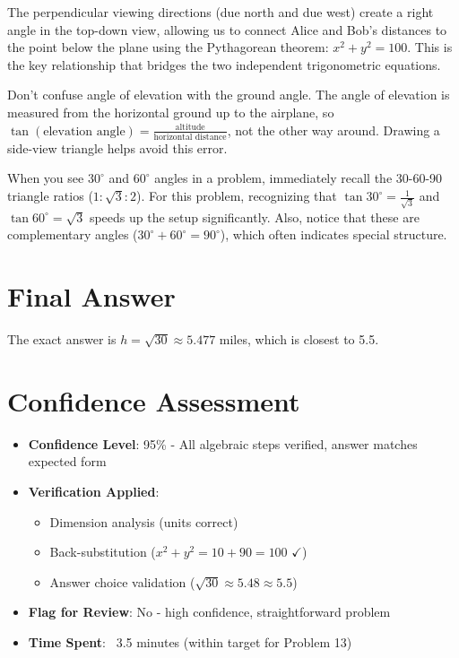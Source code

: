 \documentclass[12pt]{article}
\begin{document}
\begin{keyinsightbox}
The perpendicular viewing directions (due north and due west) create a right angle in the top-down view, allowing us to connect Alice and Bob's distances to the point below the plane using the Pythagorean theorem: $x^2 + y^2 = 100$. This is the key relationship that bridges the two independent trigonometric equations.
\end{keyinsightbox}

\begin{warningbox}
Don't confuse angle of elevation with the ground angle. The angle of elevation is measured from the horizontal ground up to the airplane, so $\tan(\text{elevation angle}) = \frac{\text{altitude}}{\text{horizontal distance}}$, not the other way around. Drawing a side-view triangle helps avoid this error.
\end{warningbox}

\begin{tipbox}
When you see $30^\circ$ and $60^\circ$ angles in a problem, immediately recall the 30-60-90 triangle ratios ($1:\sqrt{3}:2$). For this problem, recognizing that $\tan 30^\circ = \frac{1}{\sqrt{3}}$ and $\tan 60^\circ = \sqrt{3}$ speeds up the setup significantly. Also, notice that these are complementary angles ($30^\circ + 60^\circ = 90^\circ$), which often indicates special structure.
\end{tipbox}

\section*{Final Answer}

The exact answer is $h = \sqrt{30} \approx 5.477$ miles, which is closest to 5.5.

\section*{Confidence Assessment}
\begin{itemize}[leftmargin=*]
    \item \textbf{Confidence Level}: 95\% - All algebraic steps verified, answer matches expected form
    \item \textbf{Verification Applied}: 
    \begin{itemize}
        \item Dimension analysis (units correct)
        \item Back-substitution ($x^2 + y^2 = 10 + 90 = 100$ $\checkmark$)
        \item Answer choice validation ($\sqrt{30} \approx 5.48 \approx 5.5$)
    \end{itemize}
    \item \textbf{Flag for Review}: No - high confidence, straightforward problem
    \item \textbf{Time Spent}: ~3.5 minutes (within target for Problem 13)
\end{itemize}
\end{document}
